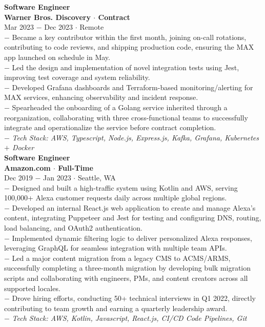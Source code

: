 \documentclass{resume}
\begin{document}
\begin{flushleft}
\footnotesize{\bf Software Engineer}\\
\footnotesize{\bf Warner Bros. Discovery $\cdot$ Contract}\\
\footnotesize{Mar 2023 $-$ Dec 2023 $\cdot$ Remote}\\[1mm]
{\scriptsize
	$-$ Became a key contributor within the first month, joining on-call rotations, contributing to code reviews, and shipping production code, ensuring the MAX app launched on schedule in May.\\
	$-$ Led the design and implementation of novel integration tests using Jest, improving test coverage and system reliability.\\
	$-$ Developed Grafana dashboards and Terraform-based monitoring/alerting for MAX services, enhancing observability and incident response.\\
	$-$ Spearheaded the onboarding of a Golang service inherited through a reorganization, collaborating with three cross-functional teams to successfully integrate and operationalize the service before contract completion.\\
	$-$ \textit{Tech Stack: AWS, Typescript, Node.js, Express.js, Kafka, Grafana, Kubernetes $+$ Docker}
}\\[3mm]

\footnotesize{\bf Software Engineer}\\
\footnotesize{\bf Amazon.com $\cdot$ Full-Time}\\
\footnotesize{Dec 2019 $-$ Jan 2023 $\cdot$ Seattle, WA}\\[1mm]
{\scriptsize
	$-$ Designed and built a high-traffic system using Kotlin and AWS, serving 100,000+ Alexa customer requests daily across multiple global regions. \\
	$-$ Developed an internal React.js web application to create and manage Alexa’s content, integrating Puppeteer and Jest for testing and configuring DNS, routing, load balancing, and OAuth2 authentication. \\
	$-$ Implemented dynamic filtering logic to deliver personalized Alexa responses, leveraging GraphQL for seamless integration with multiple team APIs. \\
	$-$ Led a major content migration from a legacy CMS to ACMS/ARMS, successfully completing a three-month migration by developing bulk migration scripts and collaborating with engineers, PMs, and content creators across all supported locales. \\
	$-$ Drove hiring efforts, conducting 50+ technical interviews in Q1 2022, directly contributing to team growth and earning a quarterly leadership award. \\
	$-$ \textit{Tech Stack: AWS, Kotlin, Javascript, React.js, CI/CD Code Pipelines, Git}
}\\[3mm]


\end{flushleft}
\end{document}
